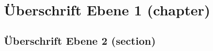 




\chapter{Überschrift Ebene 1 (chapter)}
\label{chap:UeberschriftenEbenen}

\section{Überschrift Ebene 2 (section)}
\vspace{2mm} %

